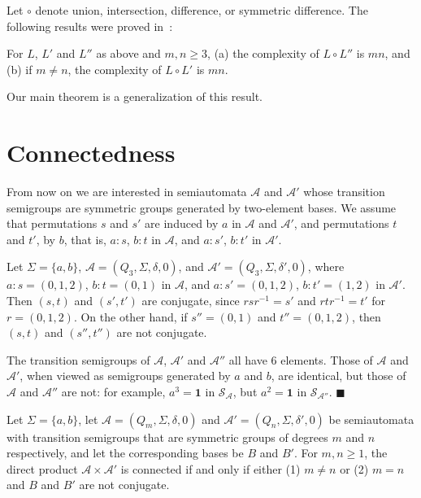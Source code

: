 \documentclass{llncs}
\newcommand{\Sig}{\Sigma}
\newcommand{\cA}{{\mathcal A}}
\newcommand{\cS}{{\mathcal S}}
\newcommand{\one}{{\mathbf 1}}
\newcommand{\qedb}{\hfill$\blacksquare$}
\begin{document}
Let $\circ$ denote union, intersection, difference, or symmetric difference.
The following results were proved in~\cite{Brz12,BrLiu12}:
\begin{proposition}
\label{prop:BrzLiu}
For $L$, $L'$ and $L''$ as above and $m,n\ge 3$,  (a) the  complexity of $L\circ L''$ is $mn$, and (b) if $m\neq n$, the  complexity of $L\circ L'$ is $mn$.
 \end{proposition}
 
Our main theorem is a generalization of this result.
\section{Connectedness}
\label{sec:connect}

From now on we are interested in semiautomata $\cA$ and $\cA'$ whose transition semigroups are symmetric groups generated by two-element bases.
We assume that permutations $s$ and $s'$ are induced by  $a$ in $\cA$ and $\cA'$, and permutations $t$ and $t'$, by  $b$, that is,
$a\colon s$, $b\colon t$ in $\cA$, and $a\colon s'$, $b\colon t'$ in $\cA'$.

\begin{example}
Let $\Sig=\{a,b\}$, $\cA=(Q_3,\Sig,\delta,0)$, and $\cA'=(Q_3,\Sig,\delta',0)$, where
$a\colon s=(0,1,2)$, $b\colon t=(0,1)$ in $\cA$, 
and $a\colon s'=(0,1,2)$, $b\colon t'=(1,2)$ 
in $\cA'$.
Then $(s,t)$ and $(s',t')$ are conjugate, since $rsr^{-1}=s'$ and
$rtr^{-1}=t'$ for $r=(0,1,2)$.
On the other hand, if  $s''=(0,1)$ and $t''=(0,1,2)$,  then $(s,t)$ and $(s'',t'')$ are not conjugate.


The transition semigroups of $\cA$, $\cA'$ and $\cA''$ all have 6 elements.
Those of $\cA$ and $\cA'$, when viewed as semigroups generated by $a$ and $b$, are identical, but those of $\cA$ and $\cA''$ are not: for example,
$a^3=\one$ in $\cS_\cA$, but $a^2=\one$ in $\cS_{\cA''}$.
\qedb
\end{example}

\begin{theorem}
\label{thm: reach}
Let  $\Sig=\{a,b\}$, let $\cA=(Q_m,\Sig, \delta,0)$ and $\cA'=(Q_n,\Sig, \delta',0)$ be 
semiautomata with transition semigroups  that are  symmetric groups  of degrees $m$ and $n$ respectively, and let the corresponding bases be $B$ and $B'$.  For $m,n\ge 1$, the direct product $\cA\times \cA'$ is connected if and only if either (1) $m\neq n$ or (2) $m=n$ and $B$ and $B'$ are not conjugate. 
\end{theorem}
\end{document}
